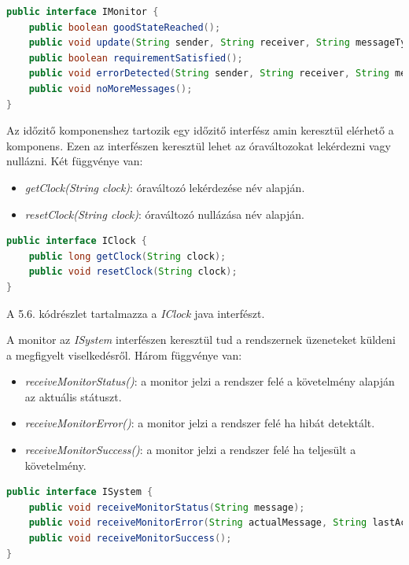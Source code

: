 \begin{lstlisting}[language=java,frame=single, float=h!, caption={Monitor interfész Java implementációja.},captionpos=b]
public interface IMonitor {
	public boolean goodStateReached();
	public void update(String sender, String receiver, String messageType, Map<String, Object> parameters);
	public boolean requirementSatisfied();
	public void errorDetected(String sender, String receiver, String messageType, Map<String, Object> parameters);
	public void noMoreMessages();
}
\end{lstlisting}

Az időzitő komponenshez tartozik egy időzitő interfész amin keresztül elérhető a komponens.
Ezen az interfészen keresztül lehet az óraváltozokat lekérdezni vagy nullázni.
Két függvénye van:

\begin{itemize}
    \item \textit{getClock(String clock)}: óraváltozó lekérdezése név alapján.
    \item \textit{resetClock(String clock)}: óraváltozó nullázása név alapján.
\end{itemize}

\begin{lstlisting}[language=java,frame=single, float=h!, caption={Időzitő interfész Java implementációja.},captionpos=b]
public interface IClock {
	public long getClock(String clock);
	public void resetClock(String clock);
}
\end{lstlisting}

A 5.6. kódrészlet tartalmazza a \textit{IClock} java interfészt.

A monitor az \textit{ISystem} interfészen keresztül tud a rendszernek üzeneteket küldeni a megfigyelt viselkedésről.
Három függvénye van:

\begin{itemize}
	\item \textit{receiveMonitorStatus()}: a monitor jelzi a rendszer felé a követelmény alapján az aktuális státuszt.
	\item \textit{receiveMonitorError()}: a monitor jelzi a rendszer felé ha hibát detektált.
	\item \textit{receiveMonitorSuccess()}: a monitor jelzi a rendszer felé ha teljesült a követelmény.
\end{itemize}

\begin{lstlisting}[language=java,frame=single, float=h!, caption={Rendszer interfész Java implementációja.},captionpos=b]
public interface ISystem {
	public void receiveMonitorStatus(String message);
	public void receiveMonitorError(String actualMessage, String lastAcceptedMessage);
	public void receiveMonitorSuccess();
}
\end{lstlisting}

